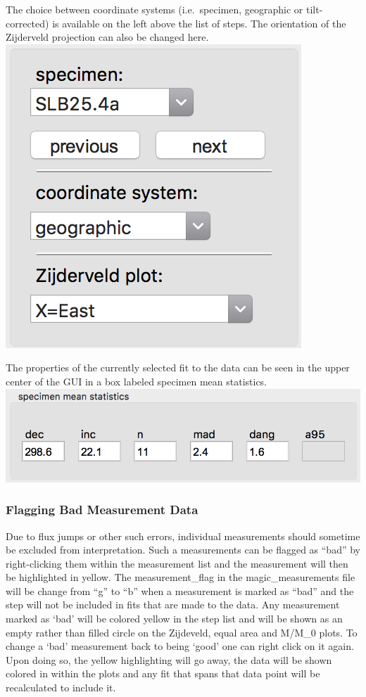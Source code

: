 The choice between coordinate systems (i.e.~specimen, geographic or
tilt-corrected) is available on the left above the list of steps. The
orientation of the Zijderveld projection can also be changed here.
\includegraphics{./images/ProjectionChoice.png}

The properties of the currently selected fit to the data can be seen in
the upper center of the GUI in a box labeled specimen mean statistics.
\includegraphics{./images/FitData.png}

\subsubsection{Flagging Bad Measurement
Data}\label{flagging-bad-measurement-data}

Due to flux jumps or other such errors, individual measurements should
sometime be excluded from interpretation. Such a measurements can be
flagged as ``bad'' by right-clicking them within the measurement list
and the measurement will then be highlighted in yellow. The
measurement\_flag in the magic\_measurements file will be change from
``g'' to ``b'' when a measurement is marked as ``bad'' and the step will
not be included in fits that are made to the data. Any measurement
marked as `bad' will be colored yellow in the step list and will be
shown as an empty rather than filled circle on the Zijdeveld, equal area
and M/M\_0 plots. To change a `bad' measurement back to being `good' one
can right click on it again. Upon doing so, the yellow highlighting will
go away, the data will be shown colored in within the plots and any fit
that spans that data point will be recalculated to include it.

